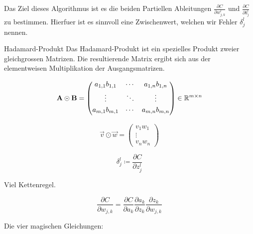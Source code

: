 \documentclass[../main]{subfiles}
\begin{document}
Das Ziel dieses Algorithmus ist es die beiden Partiellen Ableitungen
$\frac{\partial C}{\partial w_{j,k}^l}$ und $\frac{\partial C}{\partial b_j^l}$
zu bestimmen. Hierfuer ist es sinnvoll eine Zwischenwert, welchen wir Fehler
$\delta_j^l$ nennen.

\para
\begin{defbox}{Hadamard-Produkt}
  Das Hadamard-Produkt ist ein spezielles Produkt zweier gleichgrossen Matrizen.
  Die resultierende Matrix ergibt sich aus der elementweisen Multiplikation der Ausgangsmatrizen.

  \begin{minipage}{0.5\textwidth}
    \begin{equation*}
      \mathbf{A} \odot \mathbf{B} =
      \begin{pmatrix}
        a_{1,1} b_{1,1} & \cdots & a_{1,n} b_{1,n} \\[0.3em]
        \vdots & \ddots & \vdots \\[0.3em]
        a_{m,1} b_{m,1} & \cdots & a_{m,n} b_{m,n} \\[0.3em]
      \end{pmatrix}
      \in \mathbb{R}^{m \times n}
    \end{equation*}
  \end{minipage}
  \begin{minipage}{0.5\textwidth}
    \begin{equation*}
      \vec{v} \odot \vec{w} =
      \begin{pmatrix}
        v_1 w_1 \\
        \vdots \\
        v_n w_n
      \end{pmatrix}
    \end{equation*}

  \end{minipage}
\end{defbox}
\para

\begin{equation}
  \delta_j^l \coloneqq \frac{\partial C}{\partial z_j^l}
\end{equation}

Viel Kettenregel.

\begin{equation}
  \frac{\partial C}{\partial w_{j,k}} = \frac{\partial C}{\partial a_k} \frac{\partial a_k}{\partial z_k} \frac{\partial z_k}{\partial w_{j,k}}
\end{equation}

Die vier magischen Gleichungen:
\end{document}
